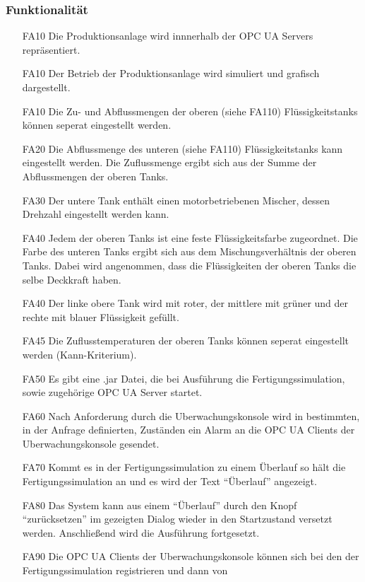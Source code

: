 \documentclass[parskip=full]{scrartcl}
\begin{document}
\subsubsection{Funktionalität}
\begin{enumerate}
  \item[FA10] Die \gls{Produktionsanlage} wird innnerhalb der \glspl{OPC UA Server} repräsentiert.
  \item[FA10] Der Betrieb der \gls{Produktionsanlage} wird simuliert und grafisch dargestellt.
  \item[FA10] Die Zu- und Abflussmengen der oberen (siehe FA110) Flüssigkeitstanks können seperat eingestellt werden.
  \item[FA20] Die Abflussmenge des unteren (siehe FA110) Flüssigkeitstanks kann eingestellt werden. Die Zuflussmenge ergibt sich aus der Summe der Abflussmengen der oberen Tanks.
  \item[FA30] Der untere Tank enthält einen motorbetriebenen Mischer, dessen Drehzahl eingestellt werden kann.
  \item[FA40] Jedem der oberen Tanks ist eine feste Flüssigkeitsfarbe zugeordnet. Die Farbe des unteren Tanks ergibt sich aus dem Mischungsverhältnis der oberen Tanks. Dabei wird
    angenommen, dass die Flüssigkeiten der oberen Tanks die selbe Deckkraft haben.
  \item[FA40] Der linke obere Tank wird mit roter, der mittlere mit grüner und der rechte mit blauer Flüssigkeit gefüllt.
  \item[FA45] Die Zuflusstemperaturen der oberen Tanks können seperat eingestellt werden (Kann-Kriterium).
  \item[FA50] Es gibt eine .jar Datei, die bei Ausführung die \gls{Fertigungssimulation}, sowie zugehörige \gls{OPC UA Server} startet.
  \item[FA60] Nach Anforderung durch die \gls{Uberwachungskonsole} wird in bestimmten, in der Anfrage definierten, Zust\"anden ein Alarm an die \glspl{OPC UA Client} der \gls{Uberwachungskonsole} gesendet.
  \item[FA70] Kommt es in der \gls{Fertigungssimulation} zu einem \"Uberlauf so h\"alt die \gls{Fertigungssimulation} an und es wird der Text "`\"Uberlauf"' angezeigt.
  \item[FA80] Das System kann aus einem "`\"Uberlauf"' durch den Knopf "`zur\"ucksetzen"' im gezeigten Dialog wieder in den Startzustand versetzt werden. Anschlie{\ss}end wird die Ausführung fortgesetzt.
  \item[FA90] Die \glspl{OPC UA Client} der \gls{Uberwachungskonsole} k\"onnen sich bei den  der \gls{Fertigungssimulation} registrieren und dann von

\end{enumerate}
\end{document}
